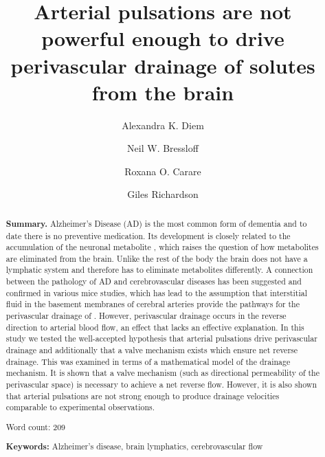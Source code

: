 \documentclass[a4paper,titlepage]{scrartcl}
\begin{document}




\title{Arterial pulsations are not powerful enough to drive perivascular drainage of solutes from the brain}
\author[1,2]{Alexandra K. Diem}
\author[2]{Neil W. Bressloff}
\author[3]{Roxana O. Carare}
\author[4]{Giles Richardson}

\maketitle

\begin{abstract}
\textbf{Summary.} Alzheimer's Disease (AD) is the most common form of dementia and to date there is no preventive medication. Its development is closely related to the accumulation of the neuronal metabolite \Ab, which raises the question of how metabolites are eliminated from the brain. Unlike the rest of the body the brain does not have a lymphatic system and therefore has to eliminate metabolites differently. A connection between the pathology of AD and cerebrovascular diseases has been suggested and confirmed in various mice studies, which has lead to the assumption that interstitial fluid in the basement membranes of cerebral arteries provide the pathways for the perivascular drainage of \Ab. However, perivascular drainage occurs in the reverse direction to arterial blood flow, an effect that lacks an effective explanation. In this study we tested the well-accepted hypothesis that arterial pulsations drive perivascular drainage and additionally that a valve mechanism exists which ensure net reverse drainage. This was examined in terms of a  mathematical model of the  drainage mechanism. It is shown that a valve mechanism (such as directional permeability of the perivascular space) is necessary to achieve a net reverse flow. However, it is also shown that arterial pulsations are not strong enough to produce drainage velocities comparable to experimental observations. %

Word count: 209

\vspace{1cm}

\textbf{Keywords:} Alzheimer's disease, brain lymphatics, cerebrovascular flow
\end{abstract}
\end{document}
